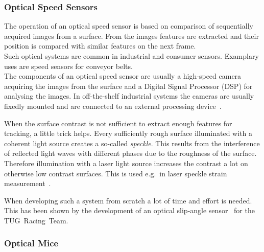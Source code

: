 \documentclass[12pt,a4paper]{article}
\begin{document}



\subsubsection{Optical Speed Sensors}

The operation of an optical speed sensor is based on comparison of sequentially acquired images from a surface.
From the images features are extracted and their position is compared with similar features on the next frame.\\
Such optical systems are common in industrial and consumer sensors.
Examplary uses are speed sensors for conveyor belts.\\
The components of an optical speed sensor are usually a high-speed camera acquiring the images from the surface and a Digital Signal Processor (DSP) for analysing the images.
In off-the-shelf industrial systems the cameras are usually fixedly mounted and are connected to an external processing device~\cite{opt_vel}.

When the surface contrast is not sufficient to extract enough features for tracking, a little trick helps.
Every sufficiently rough surface illuminated with a coherent light source creates a so-called \emph{speckle}.
This results from the interference of reflected light waves with different phases due to the roughness of the surface.
Therefore illumination with a laser light source increases the contrast a lot on otherwise low contrast surfaces.
This is used e.g.\ in laser speckle strain measurement~\cite{strain}.

When developing such a system from scratch a lot of time and effort is needed.
This has been shown by the development of an optical slip-angle sensor~\cite{Hrach2006} for the TUG~Racing~Team.

\subsubsection{Optical Mice}
\end{document}
